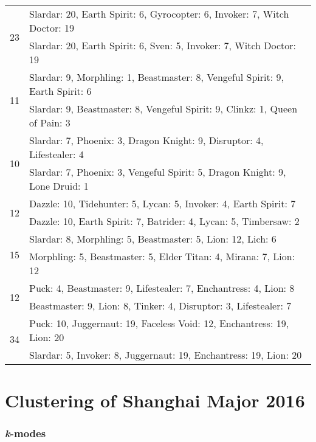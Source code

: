 \begin{table}[H]
\begin{tabular}{ | c | p{12.5cm} | }
\hline
\multirow{2}{*}{23}
& Slardar: 20, Earth Spirit: 6, Gyrocopter: 6, Invoker: 7, Witch Doctor: 19 \\
& Slardar: 20, Earth Spirit: 6, Sven: 5, Invoker: 7, Witch Doctor: 19 \\
\hline
\multirow{2}{*}{11}
& Slardar: 9, Morphling: 1, Beastmaster: 8, Vengeful Spirit: 9, Earth Spirit: 6 \\
& Slardar: 9, Beastmaster: 8, Vengeful Spirit: 9, Clinkz: 1, Queen of Pain: 3 \\
\hline
\multirow{2}{*}{10}
& Slardar: 7, Phoenix: 3, Dragon Knight: 9, Disruptor: 4, Lifestealer: 4 \\
& Slardar: 7, Phoenix: 3, Vengeful Spirit: 5, Dragon Knight: 9, Lone Druid: 1 \\
\hline
\multirow{2}{*}{12}
& Dazzle: 10, Tidehunter: 5, Lycan: 5, Invoker: 4, Earth Spirit: 7 \\
& Dazzle: 10, Earth Spirit: 7, Batrider: 4, Lycan: 5, Timbersaw: 2 \\
\hline
\multirow{2}{*}{15}
& Slardar: 8, Morphling: 5, Beastmaster: 5, Lion: 12, Lich: 6 \\
& Morphling: 5, Beastmaster: 5, Elder Titan: 4, Mirana: 7, Lion: 12 \\
\hline
\multirow{2}{*}{12}
& Puck: 4, Beastmaster: 9, Lifestealer: 7, Enchantress: 4, Lion: 8 \\
& Beastmaster: 9, Lion: 8, Tinker: 4, Disruptor: 3, Lifestealer: 7 \\
\hline
\multirow{2}{*}{34}
& Puck: 10, Juggernaut: 19, Faceless Void: 12, Enchantress: 19, Lion: 20 \\
& Slardar: 5, Invoker: 8, Juggernaut: 19, Enchantress: 19, Lion: 20 \\
\hline
    \end{tabular}
    \caption{}
    \label{}
    \end{table}


\clearpage
\section*{Clustering of Shanghai Major 2016}

\subsubsection*{\textit{k}-modes}

